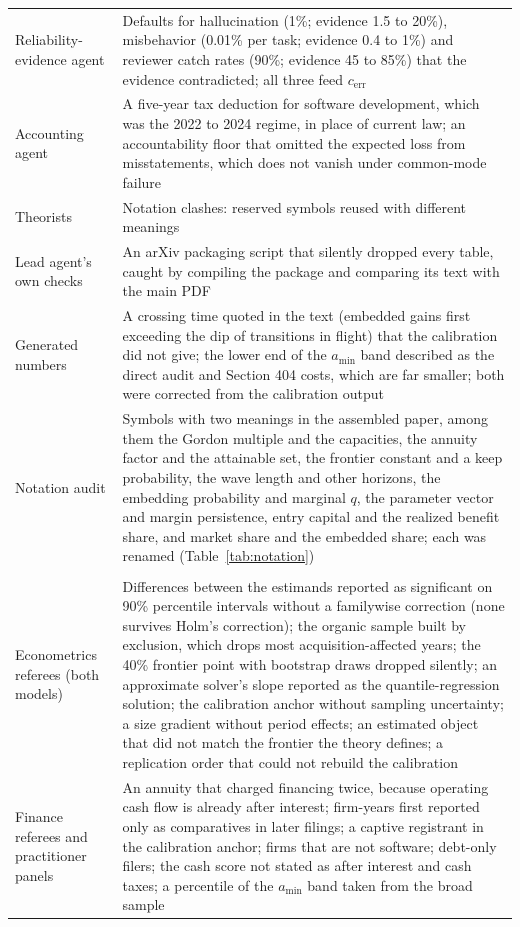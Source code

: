 {\begin{longtable}{@{}p{}p{}@{}}
Reliability-evidence agent & Defaults for hallucination (1\%; evidence 1.5 to 20\%), misbehavior (0.01\% per task; evidence 0.4 to 1\%) and reviewer catch rates (90\%; evidence 45 to 85\%) that the evidence contradicted; all three feed $c_{\mathrm{err}}$\\
Accounting agent & A five-year tax deduction for software development, which was the 2022 to 2024 regime, in place of current law; an accountability floor that omitted the expected loss from misstatements, which does not vanish under common-mode failure\\
Theorists & Notation clashes: reserved symbols reused with different meanings\\
Lead agent's own checks & An arXiv packaging script that silently dropped every table, caught by compiling the package and comparing its text with the main PDF\\
Generated numbers & A crossing time quoted in the text (embedded gains first exceeding the dip of transitions in flight) that the calibration did not give; the lower end of the $a_{\min}$ band described as the direct audit and Section 404 costs, which are far smaller; both were corrected from the calibration output\\
Notation audit & Symbols with two meanings in the assembled paper, among them the Gordon multiple and the capacities, the annuity factor and the attainable set, the frontier constant and a keep probability, the wave length and other horizons, the embedding probability and marginal $q$, the parameter vector and margin persistence, entry capital and the realized benefit share, and market share and the embedded share; each was renamed (Table~\ref{tab:notation})\\
\addlinespace\multicolumn{2}{@{}l}{\emph{Review of the first version}}\\
Econometrics referees (both models) & Differences between the estimands reported as significant on 90\% percentile intervals without a familywise correction (none survives Holm's correction); the organic sample built by exclusion, which drops most acquisition-affected years; the 40\% frontier point with bootstrap draws dropped silently; an approximate solver's slope reported as the quantile-regression solution; the calibration anchor without sampling uncertainty; a size gradient without period effects; an estimated object that did not match the frontier the theory defines; a replication order that could not rebuild the calibration\\
Finance referees and practitioner panels & An annuity that charged financing twice, because operating cash flow is already after interest; firm-years first reported only as comparatives in later filings; a captive registrant in the calibration anchor; firms that are not software; debt-only filers; the cash score not stated as after interest and cash taxes; a percentile of the $a_{\min}$ band taken from the broad sample\\

\end{longtable}}
